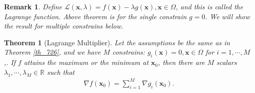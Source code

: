 \documentclass[11pt]{book}
\newtheorem{theorem}{Theorem}[chapter]
\newtheorem{remark}{Remark}[chapter]
\theoremstyle{definition}
\numberwithin{equation}{chapter}
\begin{document}
\medskip

\begin{remark}
Define $\mathcal{L}(\mathbf{x},\lambda) = f(\mathbf{x}) - \lambda g(\mathbf{x}), \mathbf{x} \in \Omega$, and this is called the Lagrange function. Above theorem is for the single constrain $g = 0$. We will show the result for multiple constrains below.
\end{remark}

\medskip

\begin{theorem}[Lagrange Multiplier]\label{th_727}
Let the assumptions be the same as in Theorem \ref{th_726}, and we have $M$ constrains: $g_i(\mathbf{x}) = 0, \mathbf{x} \in \Omega$ for $i = 1, \cdots, M$,. If $f$ attains the maximum or the minimum at $\mathbf{x}_0$, then there are $M$ scalars $\lambda_1, \cdots, \lambda_M \in \mathbb{R}$ such that
\begin{align*}
    \nabla f(\mathbf{x}_0) = \sum^M_{i=1} \nabla g_i(\mathbf{x}_0).
\end{align*}
\end{theorem}












\newpage


\end{document}
